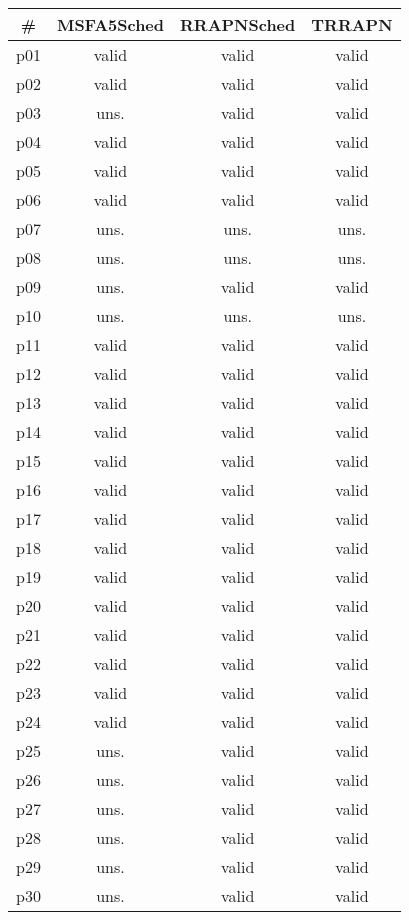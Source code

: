 \begin{tabular}{c||c|c|c}
\textbf{\#} & \textbf{MSFA5Sched} & \textbf{RRAPNSched} & \textbf{TRRAPN}\\
\hline
\hline
p01 & valid & valid & valid\\
p02 & valid & valid & valid\\
p03 & uns. & valid & valid\\
p04 & valid & valid & valid\\
p05 & valid & valid & valid\\
p06 & valid & valid & valid\\
p07 & uns. & uns. & uns.\\
p08 & uns. & uns. & uns.\\
p09 & uns. & valid & valid\\
p10 & uns. & uns. & uns.\\
p11 & valid & valid & valid\\
p12 & valid & valid & valid\\
p13 & valid & valid & valid\\
p14 & valid & valid & valid\\
p15 & valid & valid & valid\\
p16 & valid & valid & valid\\
p17 & valid & valid & valid\\
p18 & valid & valid & valid\\
p19 & valid & valid & valid\\
p20 & valid & valid & valid\\
p21 & valid & valid & valid\\
p22 & valid & valid & valid\\
p23 & valid & valid & valid\\
p24 & valid & valid & valid\\
p25 & uns. & valid & valid\\
p26 & uns. & valid & valid\\
p27 & uns. & valid & valid\\
p28 & uns. & valid & valid\\
p29 & uns. & valid & valid\\
p30 & uns. & valid & valid\\
\end{tabular}

